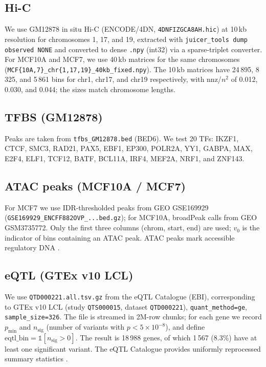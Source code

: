 \documentclass[11pt,a4paper]{article}
\begin{document}
\subsection{Hi-C}
We use GM12878 in situ Hi-C (ENCODE/4DN, \texttt{4DNFIZGCA8AH.hic}) at 10\,kb resolution \cite{rao2014} for chromosomes 1, 17, and 19, extracted with \texttt{juicer\_tools dump observed NONE} and converted to dense \texttt{.npy} (int32) via a sparse-triplet converter. For MCF10A and MCF7, we use 40\,kb matrices for the same chromosomes (\texttt{MCF\{10A,7\}\_chr\{1,17,19\}\_40kb\_fixed.npy}). The 10\,kb matrices have 24\,895, 8\,325, and 5\,861 bins for chr1, chr17, and chr19 respectively, with nnz/$n^2$ of 0.012, 0.030, and 0.044; the sizes match chromosome lengths.

\subsection{TFBS (GM12878)}
Peaks are taken from \texttt{tfbs\_GM12878.bed} (BED6). We test 20 TFs: IKZF1, CTCF, SMC3, RAD21, PAX5, EBF1, EP300, POLR2A, YY1, GABPA, MAX, E2F4, ELF1, TCF12, BATF, BCL11A, IRF4, MEF2A, NRF1, and ZNF143.

\subsection{ATAC peaks (MCF10A / MCF7)}
For MCF7 we use IDR-thresholded peaks from GEO GSE169929 (\texttt{GSE169929\_ENCFF882OVP\_...bed.gz}); for MCF10A, broadPeak calls from GEO GSM3735772. Only the first three columns (chrom, start, end) are used; $v_0$ is the indicator of bins containing an ATAC peak. ATAC peaks mark accessible regulatory DNA \cite{thurman2012}.

\subsection{eQTL (GTEx v10 LCL)}
We use \texttt{QTD000221.all.tsv.gz} from the eQTL Catalogue (EBI), corresponding to GTEx v10 LCL (study \texttt{QTS000015}, dataset \texttt{QTD000221}), \texttt{quant\_method=ge}, \texttt{sample\_size=326}. The file is streamed in 2M-row chunks; for each gene we record $p_{\min}$ and $n_{\mathrm{sig}}$ (number of variants with $p<5\times10^{-8}$), and define $\mathrm{eqtl\_bin} = \mathbb{1}[n_{\mathrm{sig}}>0]$. The result is 18\,988 genes, of which 1\,567 (8.3\%) have at least one significant variant. The eQTL Catalogue provides uniformly reprocessed summary statistics
\cite{kerimov2021}.
\end{document}
